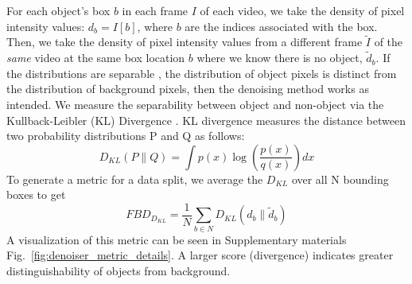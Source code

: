 For each object's box $b$ in each frame $I$ of each video, we take the density of pixel intensity values: $d_{b} = I[b]$, where $b$ are the indices associated with the box. Then, we take the density of pixel intensity values from a different frame $\tilde{I}$ of the \textit{same} video at the same box location $b$ where we know there is no object, $\tilde{d}_b$. If the distributions are separable \ie, the distribution of object pixels is distinct from the distribution of background pixels, then the denoising method works as intended. We measure the separability between object and non-object via the Kullback-Leibler (KL) Divergence \cite{Kullback51klDivergence}. KL divergence measures the distance between two probability distributions P and Q as follows:
\begin{equation}
D_{KL}(P\|Q) = \int p(x) \log(\frac{p(x)}{q(x)}) dx
\end{equation}
To generate a metric for a data split, we average the $D_{KL}$ over all N bounding boxes to get 
\begin{equation}\label{eqn:fbd}
FBD_{D_{KL}} = \frac{1}{N}\sum_{b\in{N}} D_{KL}( d_b \|\tilde{d}_b)
\end{equation}
A visualization of this metric can be seen in Supplementary materials  Fig.\ \ref{fig:denoiser_metric_details}. A larger score (divergence) indicates greater distinguishability of objects from background.